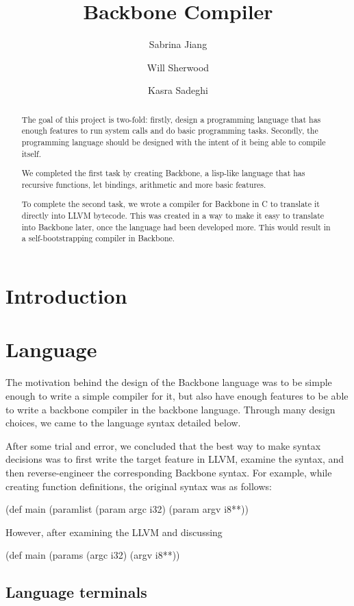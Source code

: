 \documentclass[journal=jacsat, manuscript=article]{achemso}
\author{Sabrina Jiang}
\author{Will Sherwood}
\author{Kasra Sadeghi}
\title[\texttt{achemso} demonstration]{Backbone Compiler}
\begin{document}
\begin{abstract}

The goal of this project is two-fold: firstly, design a programming language that has enough features
to run system calls and do basic programming tasks. Secondly, the programming language should be designed with the intent of it being able to compile itself. 

We completed the first task by creating Backbone, a lisp-like language that has recursive functions, let bindings, arithmetic and more basic features. 

To complete the second task, we wrote a compiler for Backbone in C to translate it directly into LLVM bytecode. This was created in a way to make it easy to translate into Backbone later, once the language had been developed more. This would result in a self-bootstrapping compiler in Backbone.

\end{abstract}

\section{Introduction}

\section{Language}

The motivation behind the design of the Backbone language was to be
simple enough to write a simple compiler for it, but also have enough
features to be able to write a backbone compiler in the backbone language.
Through many design choices, we came to the language syntax detailed below. 

After some trial and error, we concluded that the best way to make syntax decisions was to first write the target feature in LLVM, examine the syntax, and then reverse-engineer the corresponding Backbone syntax. For example, while creating function definitions, the original syntax was as follows: 

(def main (paramlist (param argc i32) (param argv i8**))

However, after examining the LLVM and discussing 

(def main (params (argc i32) (argv i8**))

\subsection{Language terminals}
\end{document}
